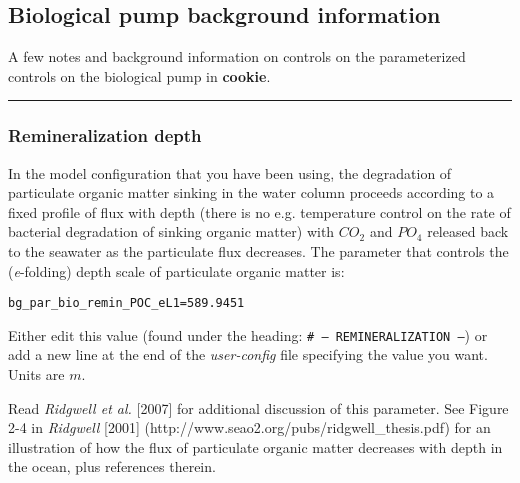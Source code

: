 
\newpage 

\subsection{Biological pump background information}

A few notes and background information on controls on the parameterized controls on the biological pump in \textbf{cookie}.

\vspace{1mm} \noindent\rule{4cm}{0.5pt} \vspace{2mm}

\subsubsection*{Remineralization depth}

\vspace{2mm}
In the model configuration that you have been using, the degradation of particulate organic matter sinking in the water column proceeds according to a fixed profile of flux with depth (there is no e.g. temperature control on the rate of bacterial degradation of sinking organic matter) with \(CO_{2}\) and \(PO_{4}\) released back to the seawater as the particulate flux decreases. The parameter that controls the (\textit{e}-folding) depth scale of particulate organic matter is:
\vspace{-1mm}\small\begin{verbatim}
bg_par_bio_remin_POC_eL1=589.9451
\end{verbatim}\normalsize\vspace{-1mm}
Either edit this value (found under the heading: \texttt{\# --- REMINERALIZATION ---}) or add a new line at the end of the \textit{user-config} file specifying the value you want. Units are \(m\).

\vspace{1mm}
Read \textit{Ridgwell et al.} [2007] for additional discussion of this parameter. See Figure 2-4 in \textit{Ridgwell} [2001] (http://www.seao2.org/pubs/ridgwell\_thesis.pdf) for an illustration of how the flux of particulate organic matter decreases with depth in the ocean, plus references therein.


